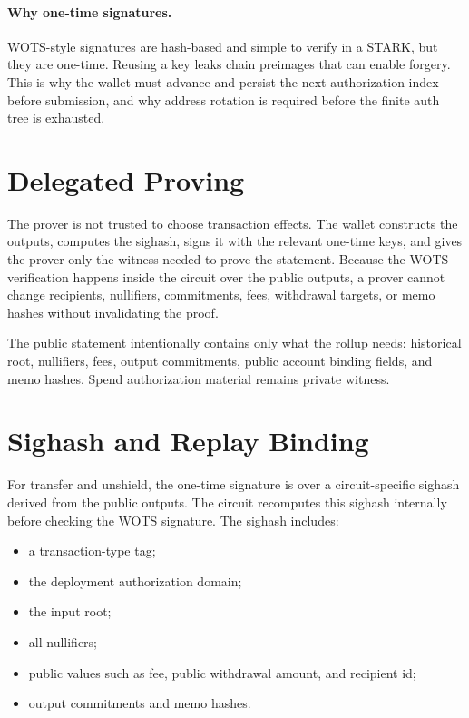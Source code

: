 \documentclass[11pt]{article}
\begin{document}
\paragraph{Why one-time signatures.}
WOTS-style signatures are hash-based and simple to verify in a STARK, but they
are one-time. Reusing a key leaks chain preimages that can enable forgery. This
is why the wallet must advance and persist the next authorization index before
submission, and why address rotation is required before the finite auth tree is
exhausted.

\section{Delegated Proving}

The prover is not trusted to choose transaction effects. The wallet constructs
the outputs, computes the sighash, signs it with the relevant one-time keys,
and gives the prover only the witness needed to prove the statement. Because
the WOTS verification happens inside the circuit over the public outputs, a
prover cannot change recipients, nullifiers, commitments, fees, withdrawal
targets, or memo hashes without invalidating the proof.

The public statement intentionally contains only what the rollup needs:
historical root, nullifiers, fees, output commitments, public account binding
fields, and memo hashes. Spend authorization material remains private witness.

\section{Sighash and Replay Binding}

For transfer and unshield, the one-time signature is over a circuit-specific
sighash derived from the public outputs. The circuit recomputes this sighash
internally before checking the WOTS signature. The sighash includes:

\begin{itemize}
  \item a transaction-type tag;
  \item the deployment authorization domain;
  \item the input root;
  \item all nullifiers;
  \item public values such as fee, public withdrawal amount, and recipient id;
  \item output commitments and memo hashes.
\end{itemize}
\end{document}
